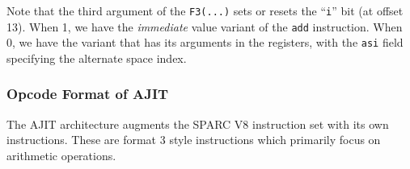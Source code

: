 Note that  the third argument  of the \texttt{F3(...)} sets  or resets
the  ``\texttt{i}''  bit  (at  offset   13).   When  1,  we  have  the
\emph{immediate} value variant of  the \texttt{add} instruction.  When
0, we have  the variant that has its arguments  in the registers, with
the \texttt{asi} field specifying the alternate space index.

\subsubsection{Opcode Format of AJIT}
\label{sec:ajit:opcode:format}

The AJIT architecture  augments the SPARC V8 instruction  set with its
own  instructions.   These  are  format  3  style  instructions  which
primarily focus on arithmetic operations.

